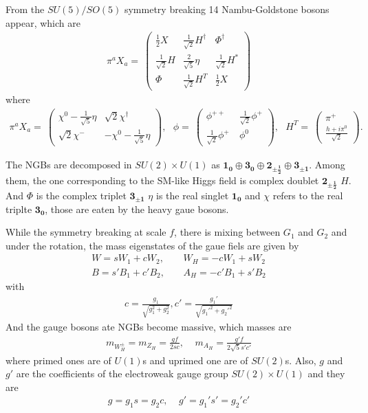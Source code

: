  From the $SU(5)/SO(5)$ symmetry breaking 14 Nambu-Goldstone bosons appear, which are 
 \begin{align}
   \pi^a X_a =~\left( \begin{array}{ccc}
  \frac{1}{2} X  &  \frac{1}{\sqrt{2}} H^\dagger & \Phi^\dagger \\
  \frac{1}{\sqrt{2}} H & \frac{2}{\sqrt{5}}\eta  & \frac{1}{\sqrt{2}} H^*\\
  \Phi & \frac{1}{\sqrt{2}} H^T &  \frac{1}{2} X
  \end{array}\right)
 \end{align}
where 
\begin{align}
   \pi^a X_a =~\left( \begin{array}{cc} \chi^0 - \frac{1}{\sqrt{5}}\eta &  \sqrt{2}\chi^\dagger \\ \sqrt{2}\chi^- & -\chi^0-\frac{1}{\sqrt{5}}\eta   \end{array}\right), ~~~
   \phi =~\left( \begin{array}{cc} \phi^{++} &  \frac{1}{\sqrt{2}}\phi^+ \\ \frac{1}{\sqrt{2}}\phi^+ \ & \phi^0   \end{array}\right),~~~
   H^T =~\left( \begin{array}{c} \pi^{+} \\ \frac{h+i\pi^0}{\sqrt{2}}\end{array}\right).
\end{align}

 The NGBs are decomposed in $SU(2) \times U(1)$ as $\mathbf{1_0 \oplus 3_0 \oplus 2_{\pm\frac{1}{2}} \oplus 3_{\pm1} }$. 
 Among them, the one corresponding to the SM-like Higgs field is complex doublet $\mathbf{2_{\pm\frac{1}{2}}}$ $H$. 
 And $\Phi$ is the complex triplet $\mathbf{3_{\pm1}}$
 $\eta$ is the real singlet $\mathbf{1_0}$ and $\chi$ refers to the real triplte $\mathbf{3_0}$, those are eaten by the heavy gaue bosons. 
 
While the symmetry breaking at scale $f$, there is mixing between $G_1$ and $G_2$ and 
under the rotation, the mass eigenstates of the gaue fiels are given by
\begin{align}
 W = sW_1 + cW_2, ~~~~~& W_H=-cW_1 + sW_2 \nonumber \\
 B = s'B_1 + c'B_2, ~~~~~& A_H= -c' B_1+ s'B_2 
\end{align}
with \begin{align}
c=\frac{g_1}{\sqrt{g_1^2 + g_2^2}}, c'=\frac{g_1'}{\sqrt{g_1'^2 + g_2'^2}}
     \end{align}
And the gauge bosons ate NGBs become massive,  
which masses are 
 \begin{align}
  m_{W_H^\pm} = m_{Z_H}=\frac{gf}{2sc}, ~~~~~ m_{A_H} = \frac{g'f}{2\sqrt{5}s'c'}
 \end{align}
where primed ones are of $U(1)$s and uprimed one are of $SU(2)$s.
Also, $g$ and $g'$ are the coefficients of the electroweak gauge group $SU(2)\times U(1)$ and they are 
\begin{align}
 g=g_1 s = g_2c, ~~~~~ g' = g_1's' = g_2' c' 
\end{align}

